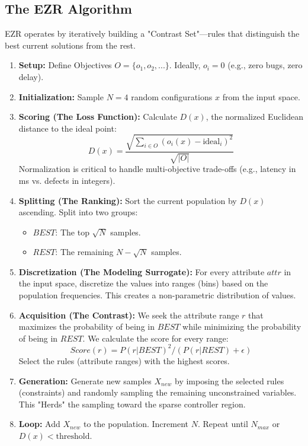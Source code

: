 \documentclass[pdflatex,sn-basic]{sn-jnl}
\begin{document}
\subsection{The EZR Algorithm}
EZR operates by iteratively building a "Contrast Set"---rules that 
distinguish the best current solutions from the rest.

\begin{enumerate}
    \item \textbf{Setup:} Define Objectives $O = \{o_1, o_2, ...\}$. 
    Ideally, $o_i=0$ (e.g., zero bugs, zero delay).
    
    \item \textbf{Initialization:} 
    Sample $N=4$ random configurations $x$ from the input space.
    
    \item \textbf{Scoring (The Loss Function):}
    Calculate $D(x)$, the normalized Euclidean distance to the ideal point:
    \begin{equation}
        D(x) = \frac{\sqrt{\sum_{i \in O} (o_i(x) - \text{ideal}_i)^2}}{\sqrt{|O|}}
    \end{equation}
    Normalization is critical to handle multi-objective trade-offs (e.g., 
    latency in ms vs. defects in integers).

    \item \textbf{Splitting (The Ranking):}
    Sort the current population by $D(x)$ ascending.
    Split into two groups:
    \begin{itemize}
        \item $BEST$: The top $\sqrt{N}$ samples.
        \item $REST$: The remaining $N - \sqrt{N}$ samples.
    \end{itemize}

    \item \textbf{Discretization (The Modeling Surrogate):}
    For every attribute $attr$ in the input space, discretize the values 
    into ranges (bins) based on the population frequencies. This creates 
    a non-parametric distribution of values.
    
    \item \textbf{Acquisition (The Contrast):}
    We seek the attribute range $r$ that maximizes the probability of being 
    in $BEST$ while minimizing the probability of being in $REST$. We 
    calculate the score for every range:
    \begin{equation}
        Score(r) = P(r | BEST)^2 / (P(r | REST) + \epsilon)
    \end{equation}
    Select the rules (attribute ranges) with the highest scores.  

    \item \textbf{Generation:}
    Generate new samples $X_{new}$ by imposing the selected rules (constraints) 
    and randomly sampling the remaining unconstrained variables. This 
    "Herds" the sampling toward the sparse controller region.

    \item \textbf{Loop:}
    Add $X_{new}$ to the population. Increment $N$. Repeat until $N_{max}$ 
    or $D(x) < \text{threshold}$.
\end{enumerate}
\end{document}
